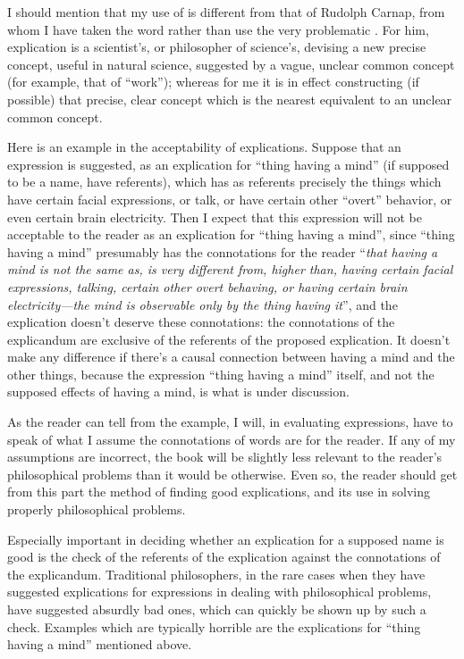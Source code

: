 I should mention that my use of  is different from that of 
Rudolph Carnap, from whom I have taken the word rather than use the very 
problematic . For him, explication is a scientist's, or philosopher 
of science's, devising a new precise concept, useful in natural science, 
suggested by a vague, unclear common concept (for example, that of 
\enquote{work}); whereas for me it is in effect constructing (if possible) that precise, 
clear concept which is the nearest equivalent to an unclear common concept. 

Here is an example in the acceptability of explications. Suppose that an 
expression is suggested, as an explication for \enquote{thing having a mind} (if 
supposed to be a name, have referents), which has as referents precisely the 
things which have certain facial expressions, or talk, or have certain other 
\enquote{overt} behavior, or even certain brain electricity. Then I expect that this 
expression will not be acceptable to the reader as an explication for \enquote{thing 
having a mind}, since \enquote{thing having a mind} presumably has the connotations 
for the reader \enquote{\emph{that having a mind is not the same as, is very different from, 
higher than, having certain facial expressions, talking, certain other overt 
behaving, or having certain brain electricity---the mind is observable only by 
the thing having it}}, and the explication doesn't deserve these connotations: 
the connotations of the explicandum are exclusive of the referents of the 
proposed explication. It doesn't make any difference if there's a causal 
connection between having a mind and the other things, because the 
expression \enquote{thing having a mind} itself, and not the supposed effects of 
having a mind, is what is under discussion. 

As the reader can tell from the example, I will, in evaluating 
expressions, have to speak of what I assume the connotations of words are 
for the reader. If any of my assumptions are incorrect, the book will be 
slightly less relevant to the reader's philosophical problems than it would be 
otherwise. Even so, the reader should get from this part the method of 
finding good explications, and its use in solving properly philosophical 
problems. 

Especially important in deciding whether an explication for a supposed 
name is good is the check of the referents of the explication against the 
connotations of the explicandum. Traditional philosophers, in the rare cases 
when they have suggested explications for expressions in dealing with 
philosophical problems, have suggested absurdly bad ones, which can quickly 
be shown up by such a check. Examples which are typically horrible are the 
explications for \enquote{thing having a mind} mentioned above. 

